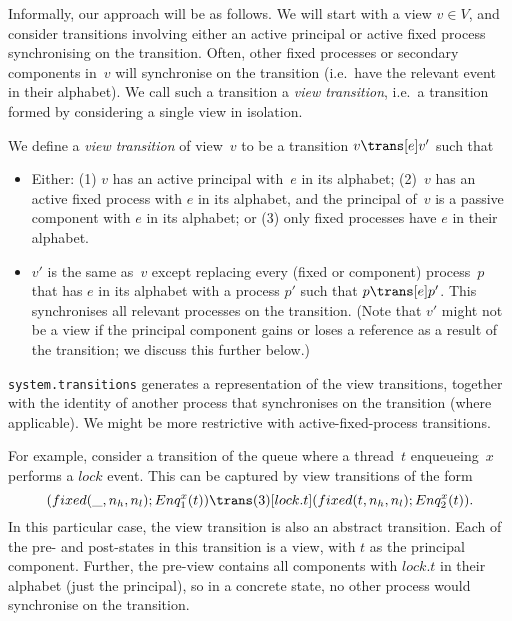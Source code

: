 Informally, our approach will be as follows.  We will start with a view $v \in
V$, and consider transitions involving either an active principal or active
fixed process synchronising on the transition.  Often, other fixed processes
or secondary components in~$v$ will synchronise on the transition (i.e.~have
the relevant event in their alphabet).  We call such a transition a \emph{view
  transition}, i.e.~a transition formed by considering a single view in
isolation.
%
\begin{definition}
We define a \emph{view transition} of view~$v$ to be a transition $v \trans[e]
v'$ such that
%
\begin{itemize}
\item Either: (1) $v$ has an active principal with~$e$ in its alphabet; (2)~$v$
  has an active fixed process with $e$ in its alphabet, and the principal
  of~$v$ is a passive component with $e$ in its alphabet; or (3) only fixed
  processes have $e$ in their alphabet.

\item $v'$ is the same as~$v$ except replacing every (fixed or component)
  process~$p$ that has $e$ in its alphabet with a process $p'$ such that \( p
  \trans[e] p' \).  This synchronises all relevant processes on the
  transition. (Note that $v'$ might not be a view if the principal component
  gains or loses a reference as a result of the transition; we discuss this
  further below.)
\end{itemize}
\end{definition}

\begin{impNote}
\texttt{system.transitions} generates a representation of the view
  transitions, together with the identity of another process that synchronises
  on the transition (where applicable).  We might be more restrictive with
  active-fixed-process transitions. 
\end{impNote}

For example, consider a transition of the queue where a thread~$t$
enqueueing~$x$ performs a $lock$ event.  This can be captured by view
transitions of the form
%
\begin{equation}
(fixed(\_, n_h, n_l); Enq^x_1(t))  \trans(3)[lock.t]
  (fixed(t, n_h, n_l); Enq^x_2(t)) .
\label{trans:lock}
\end{equation}
%
%
In this particular case, the view transition is also an abstract transition.
Each of the pre- and post-states in this transition is a view, with $t$ as the
principal component.  Further, the pre-view contains all components with
$lock.t$ in their alphabet (just the principal), so in a concrete state, no
other process would synchronise on the transition.

